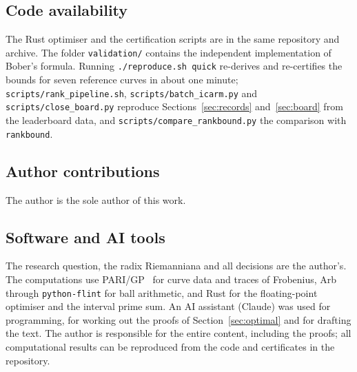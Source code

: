 \documentclass[11pt]{amsart}
\theoremstyle{remark}
\theoremstyle{definition}
\begin{document}
\subsection*{Code availability} The Rust optimiser and the certification scripts are in the same repository and archive. The folder \texttt{validation/} contains the independent implementation of Bober's formula. Running \texttt{./reproduce.sh quick} re-derives and re-certifies the bounds for seven reference curves in about one minute; \texttt{scripts/rank\_pipeline.sh}, \texttt{scripts/batch\_icarm.py} and \texttt{scripts/close\_board.py} reproduce Sections~\ref{sec:records} and~\ref{sec:board} from the leaderboard data, and \texttt{scripts/compare\_rankbound.py} the comparison with \texttt{rankbound}.

\subsection*{Author contributions} The author is the sole author of this work.

\subsection*{Software and AI tools} The research question, the radix Riemanniana and all decisions are the author's. The computations use PARI/GP~\cite{PARI} for curve data and traces of Frobenius, Arb~\cite{Arb} through \texttt{python-flint} for ball arithmetic, and Rust for the floating-point optimiser and the interval prime sum. An AI assistant (Claude) was used for programming, for working out the proofs of Section~\ref{sec:optimal} and for drafting the text. The author is responsible for the entire content, including the proofs; all computational results can be reproduced from the code and certificates in the repository.
\end{document}
